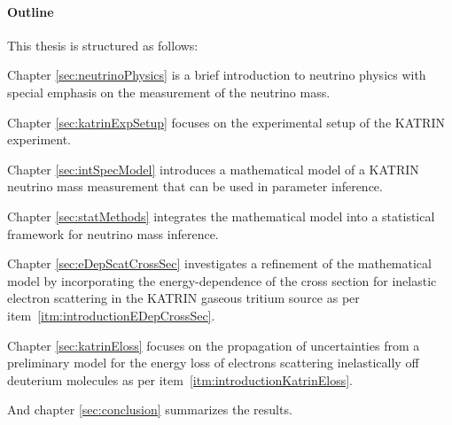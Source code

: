 \paragraph{Outline}
This thesis is structured as follows:

Chapter \ref{sec:neutrinoPhysics} is a brief introduction to neutrino physics with special emphasis on the measurement of the neutrino mass.

Chapter \ref{sec:katrinExpSetup} focuses on the experimental setup of the KATRIN experiment.

Chapter \ref{sec:intSpecModel} introduces a mathematical model of a KATRIN neutrino mass measurement that can be used in parameter inference.

Chapter \ref{sec:statMethods} integrates the mathematical model into a statistical framework for neutrino mass inference.

Chapter \ref{sec:eDepScatCrossSec} investigates a refinement of the mathematical model by incorporating the energy-dependence of the cross section for inelastic electron scattering in the KATRIN gaseous tritium source as per item~\ref{itm:introductionEDepCrossSec}.

Chapter \ref{sec:katrinEloss} focuses on the propagation of uncertainties from a preliminary model for the energy loss of electrons scattering inelastically off deuterium molecules as per item~\ref{itm:introductionKatrinEloss}.

And chapter \ref{sec:conclusion} summarizes the results.